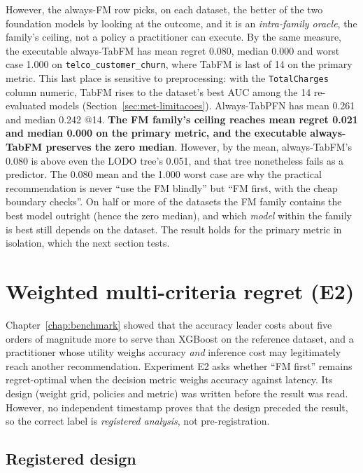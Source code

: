 However, the always-FM row picks, on each dataset, the better of the
two foundation models by looking at the outcome, and it is an \emph{intra-family oracle}, the family's ceiling, not a policy a practitioner can execute. By the same measure, the executable always-TabFM has mean regret 0.080, median 0.000 and worst case 1.000 on
\texttt{telco\_\allowbreak customer\_\allowbreak churn}, where TabFM
is last of 14 on the primary metric. This last place is sensitive to
preprocessing: with the \texttt{TotalCharges} column numeric, TabFM
rises to the dataset's best AUC among the 14 re-evaluated models
(Section~\ref{sec:met-limitacoes}). Always-TabPFN has mean 0.261 and
median 0.242 @14. \textbf{The FM family's ceiling reaches mean regret
0.021 and median 0.000 on the primary metric, and the executable
always-TabFM preserves the zero median}. However, by the mean,
always-TabFM's 0.080 is above even the LODO tree's 0.051, and that
tree nonetheless fails as a predictor. The 0.080 mean and the 1.000 worst case are why the practical recommendation is never ``use the FM blindly'' but ``FM first, with the cheap boundary checks''. On
half or more of the datasets the FM family contains the best model
outright (hence the zero median), and which \emph{model} within
the family is best still depends on the dataset. The result holds for the primary metric in isolation, which the next section tests.

\section{Weighted multi-criteria regret (E2)}
\label{sec:regret-ponderado}

Chapter~\ref{chap:benchmark} showed that the accuracy leader costs
about five orders of magnitude more to serve than XGBoost on the
reference dataset, and a practitioner whose utility weighs accuracy
\emph{and} inference cost may legitimately reach another
recommendation. Experiment E2 asks whether ``FM first'' remains
regret-optimal when the decision metric weighs accuracy against
latency. Its design (weight grid, policies and metric) was written
before the result was read. However, no independent timestamp proves that the design preceded the result, so the correct label is \emph{registered analysis}, not pre-registration.

\subsection{Registered design}
\label{sec:e2-desenho}

